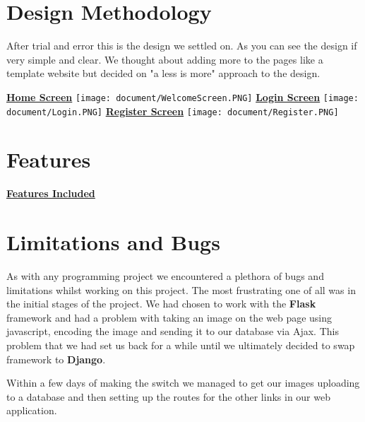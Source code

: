\documentclass{article}
\begin{document}
\begin{flushleft}
\newpage
\section{Design Methodology}
After trial and error this is the design we settled on. As you can see the design if very simple and clear. We thought about adding more to the pages like a template website but decided on "a less is more" approach to the design.

\textbf{\underline{Home Screen}}
\newline
\texttt{[image: document/WelcomeScreen.PNG]}
\newline\newpage
\textbf{\underline{Login Screen}}
\newline
\texttt{[image: document/Login.PNG]}
\newline
\textbf{\underline{Register Screen}}
\newline
\texttt{[image: document/Register.PNG]}
\label{fig:WebsiteImages}\newline
\section{Features}
\textbf{\underline{Features Included}} \newline
{}\newline
{}\newline
{}\newline
\newpage
\section{Limitations and Bugs}
As with any programming project we encountered a plethora of bugs and limitations whilst working on this project. The most frustrating one of all was in the initial stages of the project. We had chosen to work with the \textbf{Flask} framework and had a problem with taking an image on the web page using javascript, encoding the image and sending it to our database via Ajax. This problem that we had set us back for a while until we ultimately decided to swap framework to \textbf{Django}. 

Within a few days of making the switch we managed to get our images uploading to a database and then setting up the routes for the other links in our web application.


\end{flushleft}
\end{document}
